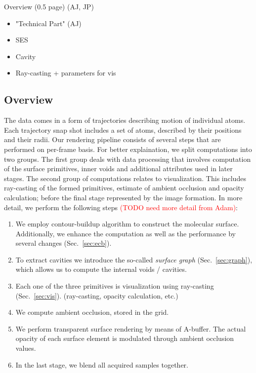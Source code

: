 Overview (0.5 page) (AJ, JP)
\begin{itemize}
  \item "Technical Part" (AJ)
  \item SES
  \item Cavity
  \item Ray-casting + parameters for vis
\end{itemize}

\subsection{Overview}

The data comes in a form of trajectories describing motion of individual atoms. Each trajectory snap shot includes a set of atoms, described by their positions and their radii. Our rendering pipeline consists of several steps that are performed on per-frame basis. 
For better explaination, we split computations into two groups. The first group deals with data processing that involves computation of the surface primitives, inner voids and additional attributes used in later stages. The second group of computations relates to visualization. This includes ray-casting of the formed primitives, estimate of ambient occlusion and opacity calculation; before the final stage represented by the image formation. In more detail, we perform the following steps \textcolor{red}{(TODO need more detail from Adam)}:
	\begin{enumerate}
	  \item We employ contour-buildup algorithm to construct the molecular surface. Additionally, we enhance the computation as well as the performance by several changes (Sec.~\ref{sec:ecb}).
		\item To extract cavities we introduce the so-called \textit{surface graph} (Sec.~\ref{sec:graph}), which allows us to compute the internal voids / cavities.
		\item Each one of the three primitives is visualization using ray-casting (Sec.~\ref{sec:vis}). (ray-casting, opacity calculation, etc.)
		\item We compute ambient occlusion, stored in the grid.
		\item We perform transparent surface rendering by means of A-buffer. The actual opacity of each surface element is modulated through ambient occlusion values.
		\item In the last stage, we blend all acquired samples together.
	\end{enumerate}

